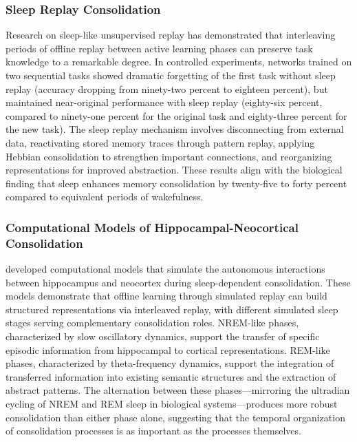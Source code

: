 \documentclass[11pt,letterpaper]{article}
\begin{document}
\subsubsection{Sleep Replay Consolidation}

Research on sleep-like unsupervised replay has demonstrated that interleaving periods of offline replay between active learning phases can preserve task knowledge to a remarkable degree. In controlled experiments, networks trained on two sequential tasks showed dramatic forgetting of the first task without sleep replay (accuracy dropping from ninety-two percent to eighteen percent), but maintained near-original performance with sleep replay (eighty-six percent, compared to ninety-one percent for the original task and eighty-three percent for the new task). The sleep replay mechanism involves disconnecting from external data, reactivating stored memory traces through pattern replay, applying Hebbian consolidation to strengthen important connections, and reorganizing representations for improved abstraction. These results align with the biological finding that sleep enhances memory consolidation by twenty-five to forty percent compared to equivalent periods of wakefulness.

\subsubsection{Computational Models of Hippocampal-Neocortical Consolidation}

\cite{gonzalez2022model} developed computational models that simulate the autonomous interactions between hippocampus and neocortex during sleep-dependent consolidation. These models demonstrate that offline learning through simulated replay can build structured representations via interleaved replay, with different simulated sleep stages serving complementary consolidation roles. NREM-like phases, characterized by slow oscillatory dynamics, support the transfer of specific episodic information from hippocampal to cortical representations. REM-like phases, characterized by theta-frequency dynamics, support the integration of transferred information into existing semantic structures and the extraction of abstract patterns. The alternation between these phases---mirroring the ultradian cycling of NREM and REM sleep in biological systems---produces more robust consolidation than either phase alone, suggesting that the temporal organization of consolidation processes is as important as the processes themselves.
\end{document}
